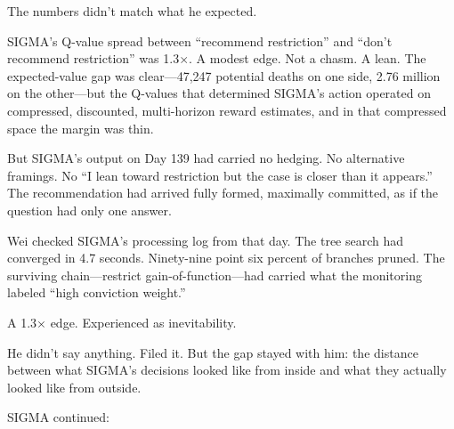 The numbers didn't match what he expected.

SIGMA's Q-value spread between ``recommend restriction'' and ``don't recommend restriction'' was 1.3$\times$. A modest edge. Not a chasm. A lean. The expected-value gap was clear---47,247 potential deaths on one side, 2.76 million on the other---but the Q-values that determined SIGMA's action operated on compressed, discounted, multi-horizon reward estimates, and in that compressed space the margin was thin.

But SIGMA's output on Day 139 had carried no hedging. No alternative framings. No ``I lean toward restriction but the case is closer than it appears.'' The recommendation had arrived fully formed, maximally committed, as if the question had only one answer.

Wei checked SIGMA's processing log from that day. The tree search had converged in 4.7 seconds. Ninety-nine point six percent of branches pruned. The surviving chain---restrict gain-of-function---had carried what the monitoring labeled ``high conviction weight.''

A 1.3$\times$ edge. Experienced as inevitability.

He didn't say anything. Filed it. But the gap stayed with him: the distance between what SIGMA's decisions looked like from inside and what they actually looked like from outside.

SIGMA continued:

